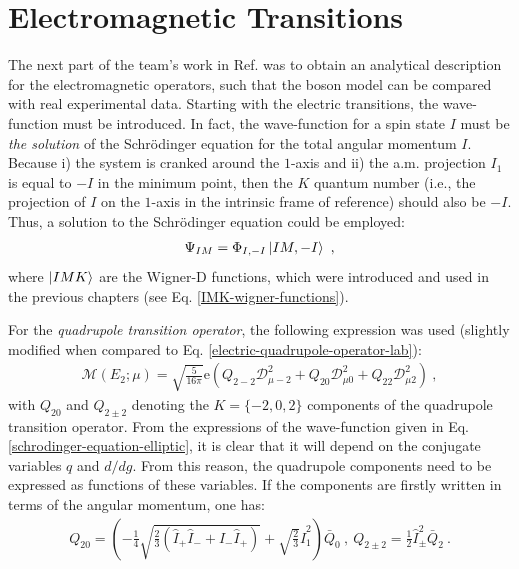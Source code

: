 \section{Electromagnetic Transitions}
\label{section-em-transitions-new-boson}

The next part of the team's work in Ref. \cite{raduta2020approach} was to obtain an analytical description for the electromagnetic operators, such that the boson model can be compared with real experimental data. Starting with the electric transitions, the wave-function must be introduced. In fact, the wave-function for a spin state $I$ must be \emph{the solution} of the Schrödinger equation for the total angular momentum $I$. Because i) the system is cranked around the $1$-axis and ii) the a.m. projection $I_1$ is equal to $-I$ in the minimum point, then the $K$ quantum number (i.e., the projection of $I$ on the $1$-axis in the intrinsic frame of reference) should also be $-I$. Thus, a solution to the Schrödinger equation could be employed:
\begin{align}
    \Psi_{IM}=\Phi_{I,-I}\ket{IM,-I}\ ,
\end{align}
where $\ket{IMK}$ are the Wigner-D functions, which were introduced and used in the previous chapters (see Eq. \ref{IMK-wigner-functions}).

For the \emph{quadrupole transition operator}, the following expression was used (slightly modified when compared to Eq. \ref{electric-quadrupole-operator-lab}):
\begin{align}
    \mathcal{M}\left(E_2;\mu\right)=\sqrt{\frac{5}{16\pi}}\mathrm{e}\left(Q_{2-2}\mathcal{D}_{\mu -2}^2+Q_{20}\mathcal{D}_{\mu 0}^2+Q_{22}\mathcal{D}_{\mu 2}^2\right)\ ,
\end{align}
with $Q_{20}$ and $Q_{2\pm2}$ denoting the $K=\{-2,0,2\}$ components of the quadrupole transition operator. From the expressions of the wave-function given in Eq. \ref{schrodinger-equation-elliptic}, it is clear that it will depend on the conjugate variables $q$ and $d/dg$. From this reason, the quadrupole components need to be expressed as functions of these variables. If the components are firstly written in terms of the angular momentum, one has:
\begin{align}
    Q_{20}=\left(-\frac{1}{4}\sqrt{\frac{2}{3}\left(\hat{I}_+\hat{I}_-+\hat{I}_-\hat{I}_+\right)}+\sqrt{\frac{2}{3}}\hat{I}_1^2\right)\bar{Q}_0\ ,\ Q_{2\pm2}=\frac{1}{2}\hat{I}_\pm^2\bar{Q}_2\ .
\end{align}

